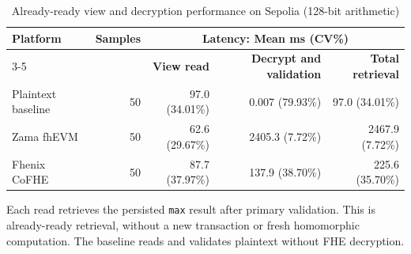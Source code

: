 \begin{table}[!t]
\caption{Already-ready view and decryption performance on Sepolia (128-bit arithmetic)}
\label{tab:ready-view-decrypt-sepolia-128}
\centering
\scriptsize
\setlength{\tabcolsep}{4pt}
\begin{tabular}{|l|r|rrr|}
\hline
\textbf{Platform} & \textbf{Samples} & \multicolumn{3}{c|}{\textbf{Latency: Mean ms (CV\%)}} \\
\cline{3-5}
& & \textbf{View read} & \textbf{Decrypt and validation} & \textbf{Total retrieval} \\
\hline
Plaintext baseline & 50 & 97.0 (34.01\%) & 0.007 (79.93\%) & 97.0 (34.01\%) \\
Zama fhEVM & 50 & 62.6 (29.67\%) & 2405.3 (7.72\%) & 2467.9 (7.72\%) \\
Fhenix CoFHE & 50 & 87.7 (37.97\%) & 137.9 (38.70\%) & 225.6 (35.70\%) \\
\hline
\end{tabular}
\vspace{2pt}
\parbox{\textwidth}{\scriptsize Each read retrieves the persisted \texttt{max} result after primary validation. This is already-ready retrieval, without a new transaction or fresh homomorphic computation. The baseline reads and validates plaintext without FHE decryption.}
\end{table}

